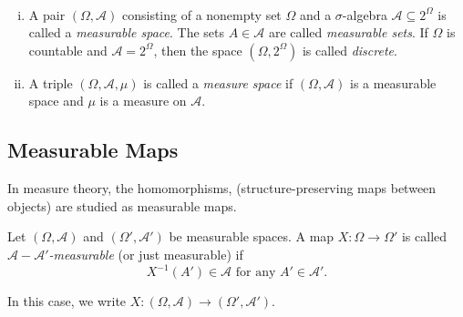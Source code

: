 \begin{definition}
~
\begin{enumerate}[(i)]
    \item A pair $(\Omega,\mathcal{A})$ consisting of a nonempty set $\Omega$ and a $\sigma$-algebra $\mathcal{A}\subseteq2^\Omega$ is called a \textit{measurable space}. The sets $A\in\mathcal{A}$ are called \textit{measurable sets}. If $\Omega$ is countable and $\mathcal{A}=2^\Omega$, then the space $(\Omega,2^\Omega)$ is called \textit{discrete}.
    
    \item A triple $(\Omega,\mathcal{A},\mu)$ is called a \textit{measure space} if $(\Omega,\mathcal{A})$ is a measurable space and $\mu$ is a measure on $\mathcal{A}$.
\end{enumerate}
\end{definition}

\subsection{Measurable Maps}

In measure theory, the homomorphisms, (structure-preserving maps between objects) are studied as measurable maps.

\begin{definition}
    Let $(\Omega,\mathcal{A})$ and $(\Omega',\mathcal{A}')$ be measurable spaces. A map $X:\Omega\to\Omega'$ is called \textit{$\mathcal{A}-\mathcal{A}'$-measurable} (or just measurable) if
    $$X^{-1}(A')\in\mathcal{A}\text{ for any }A'\in\mathcal{A}'.$$
\end{definition}

In this case, we write $X:(\Omega,\mathcal{A})\to(\Omega',\mathcal{A}')$.

